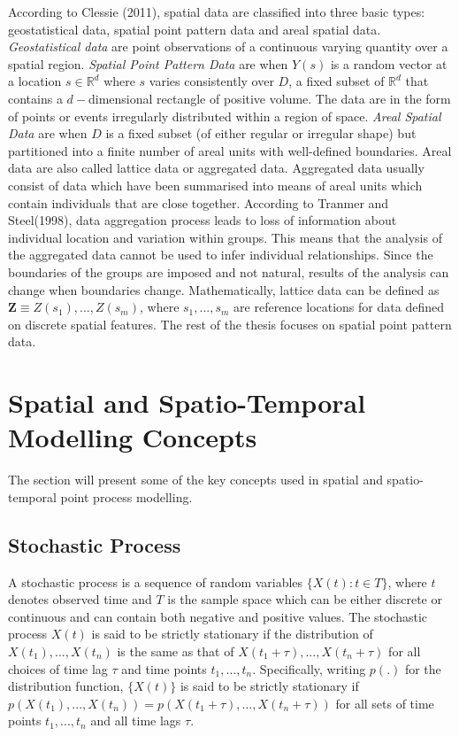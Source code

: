 \documentclass[12pt,a4paper]{report}
\begin{document}
According to Clessie (2011), spatial data are classified into three basic types: geostatistical data, spatial point pattern data and areal spatial data. \textit{Geostatistical data} are point observations of a continuous varying quantity over a spatial region. \textit{Spatial Point Pattern Data} are when $Y(s)$ is a random vector at a location $s \in \mathbb{R}^d$ where $s$ varies consistently over $D$, a fixed subset of $\mathbb{R}^d$ that contains a $d-$dimensional rectangle of positive volume. The data are in the form of points or events irregularly distributed within a region of space. \textit{Areal Spatial Data} are when $D$ is a fixed subset (of either regular or irregular shape) but partitioned into a finite number of areal units with well-defined boundaries. Areal data are also called lattice data or aggregated data. Aggregated data usually consist of data which have been summarised into means of areal units which contain individuals that are close together\cite{CressieWikle2011}. According to Tranmer and Steel(1998), data aggregation process leads to loss of information about individual location and variation within groups.\cite{Tranmer&Steel1998} This means that the analysis of the aggregated data cannot be used to infer individual relationships. Since the boundaries of the groups are imposed and not natural, results of the analysis can change when boundaries change. Mathematically, lattice data can be defined as $\textbf{Z} \equiv {Z(s_1),...,Z(s_m)}$, where ${s_1,...,s_m}$ are reference locations for data defined on discrete spatial features.\cite{CressieWikle2011} The rest of the thesis focuses on spatial point pattern data.

\section{Spatial and Spatio-Temporal Modelling Concepts}

The section will present some of the key concepts used in spatial and spatio-temporal point process modelling.

\subsection{Stochastic Process} \label{2.3.1}
 
A stochastic process is a sequence of random variables $\lbrace X(t):t\in T \rbrace$, where $t$ denotes observed time and $T$ is the sample space which can be either discrete or continuous and can contain both negative and positive values. The stochastic process $X(t)$ is said to be strictly stationary if the distribution of $X(t_1),...,X(t_n)$ is the same as that of  $X(t_1 + \tau),...,X(t_n + \tau)$ for all choices of time lag $\tau$ and time points $t_1,...,t_n$. Specifically, writing $p(.)$ for the distribution function, $\lbrace X(t)\rbrace$ is said to be strictly stationary if $p(X(t_1),...,X(t_n)) = p(X(t_1 + \tau),...,X(t_n + \tau))$ for all sets of time points $t_1,...,t_n$ and all time lags $\tau$.\\
\end{document}
